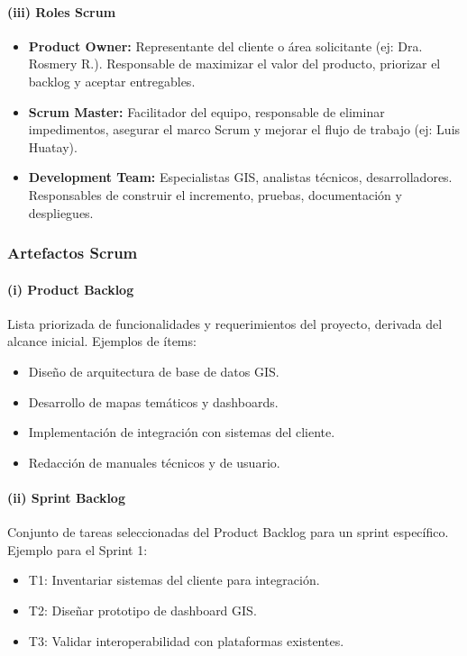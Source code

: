 \paragraph{(iii) Roles Scrum}
\begin{itemize}
  \item \textbf{Product Owner:} Representante del cliente o área solicitante (ej: Dra. Rosmery R.). Responsable de maximizar el valor del producto, priorizar el backlog y aceptar entregables.
  \item \textbf{Scrum Master:} Facilitador del equipo, responsable de eliminar impedimentos, asegurar el marco Scrum y mejorar el flujo de trabajo (ej: Luis Huatay).
  \item \textbf{Development Team:} Especialistas GIS, analistas técnicos, desarrolladores. Responsables de construir el incremento, pruebas, documentación y despliegues.
\end{itemize}

\subsubsection{Artefactos Scrum}

\paragraph{(i) Product Backlog}
Lista priorizada de funcionalidades y requerimientos del proyecto, derivada del alcance inicial. Ejemplos de ítems:
\begin{itemize}
  \item Diseño de arquitectura de base de datos GIS.
  \item Desarrollo de mapas temáticos y dashboards.
  \item Implementación de integración con sistemas del cliente.
  \item Redacción de manuales técnicos y de usuario.
\end{itemize}

\paragraph{(ii) Sprint Backlog}
Conjunto de tareas seleccionadas del Product Backlog para un sprint específico. Ejemplo para el Sprint 1:
\begin{itemize}
  \item T1: Inventariar sistemas del cliente para integración.
  \item T2: Diseñar prototipo de dashboard GIS.
  \item T3: Validar interoperabilidad con plataformas existentes.
\end{itemize}


